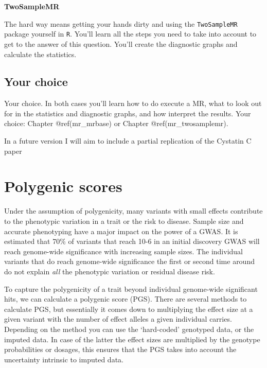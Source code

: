 \documentclass[
]{book}
\newcommand{\passthrough}[1]{#1}
\begin{document}
\textbf{TwoSampleMR}

The hard way means getting your hands dirty and using the \passthrough{\lstinline!TwoSampleMR!} package yourself in \passthrough{\lstinline!R!}. You'll learn all the steps you need to take into account to get to the answer of this question. You'll create the diagnostic graphs and calculate the statistics.

\hypertarget{your-choice}{%
\subsection{Your choice}\label{your-choice}}

Your choice. In both cases you'll learn how to do execute a MR, what to look out for in the statistics and diagnostic graphs, and how interpret the results. Your choice: Chapter @ref(mr\_mrbase) or Chapter @ref(mr\_twosamplemr).

In a future version I will aim to include a partial replication of the Cystatin C paper\citep{vanderlaan2016}

\hypertarget{polygenic-scores}{%
\section{Polygenic scores}\label{polygenic-scores}}

Under the assumption of polygenicity, many variants with small effects contribute to the phenotypic variation in a trait or the risk to disease. Sample size and accurate phenotyping have a major impact on the power of a GWAS. It is estimated that 70\% of variants that reach 10-6 in an initial discovery GWAS will reach genome-wide significance with increasing sample sizes. The individual variants that do reach genome-wide significance the first or second time around do not explain \emph{all} the phenotypic variation or residual disease risk.

To capture the polygenicity of a trait beyond individual genome-wide significant hits, we can calculate a polygenic score (PGS). There are several methods to calculate PGS, but essentially it comes down to multiplying the effect size at a given variant with the number of effect alleles a given individual carries.
Depending on the method you can use the `hard-coded' genotyped data, or the imputed data. In case of the latter the effect sizes are multiplied by the genotype probabilities or dosages, this ensures that the PGS takes into account the uncertainty intrinsic to imputed data.
\end{document}
